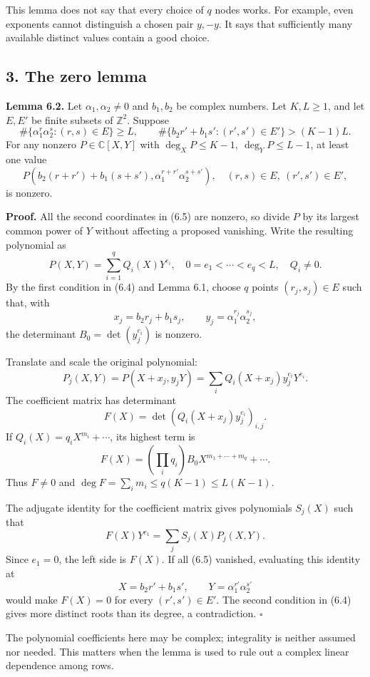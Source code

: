 \documentclass[
  11pt,
  a4paper,
]{article}
\begin{document}
This lemma does not say that every choice of \(q\) nodes works. For
example, even exponents cannot distinguish a chosen pair \(y,-y\). It
says that sufficiently many available distinct values contain a good
choice.

\subsection{3. The zero lemma}\label{the-zero-lemma}

\textbf{Lemma 6.2.} Let \(\alpha_1,\alpha_2\ne0\) and \(b_1,b_2\) be
complex numbers. Let \(K,L\ge1\), and let \(E,E'\) be finite subsets of
\(\mathbb Z^2\). Suppose \[
\#\{\alpha_1^r\alpha_2^s:(r,s)\in E\}\ge L,\qquad
\#\{b_2r'+b_1s':(r',s')\in E'\}>(K-1)L. \tag{6.4}
\] For any nonzero \(P\in\mathbb C[X,Y]\) with
\(\deg_XP\le K-1,\ \deg_YP\le L-1\), at least one value \[
P\!\left(b_2(r+r')+b_1(s+s'),
\alpha_1^{r+r'}\alpha_2^{s+s'}\right),
\quad (r,s)\in E,\ (r',s')\in E', \tag{6.5}
\] is nonzero.

\textbf{Proof.} All the second coordinates in (6.5) are nonzero, so
divide \(P\) by its largest common power of \(Y\) without affecting a
proposed vanishing. Write the resulting polynomial as \[
P(X,Y)=\sum_{i=1}^q Q_i(X)Y^{e_i},
\quad 0=e_1<\cdots<e_q<L,\quad Q_i\ne0.
\] By the first condition in (6.4) and Lemma 6.1, choose \(q\) points
\((r_j,s_j)\in E\) such that, with \[
x_j=b_2r_j+b_1s_j,\qquad y_j=\alpha_1^{r_j}\alpha_2^{s_j},
\] the determinant \(B_0=\det(y_j^{e_i})\) is nonzero.

Translate and scale the original polynomial: \[
P_j(X,Y)=P(X+x_j,y_jY)
=\sum_i Q_i(X+x_j)y_j^{e_i}Y^{e_i}.
\] The coefficient matrix has determinant \[
F(X)=\det(Q_i(X+x_j)y_j^{e_i})_{i,j}.
\] If \(Q_i(X)=q_iX^{m_i}+\cdots\), its highest term is \[
F(X)=\left(\prod_iq_i\right)B_0X^{m_1+\cdots+m_q}+\cdots.
\] Thus \(F\ne0\) and \(\deg F=\sum_i m_i\le q(K-1)\le L(K-1)\).

The adjugate identity for the coefficient matrix gives polynomials
\(S_j(X)\) such that \[
F(X)Y^{e_1}=\sum_j S_j(X)P_j(X,Y).
\] Since \(e_1=0\), the left side is \(F(X)\). If all (6.5) vanished,
evaluating this identity at \[
X=b_2r'+b_1s',\qquad Y=\alpha_1^{r'}\alpha_2^{s'}
\] would make \(F(X)=0\) for every \((r',s')\in E'\). The second
condition in (6.4) gives more distinct roots than its degree, a
contradiction. \(\square\)

The polynomial coefficients here may be complex; integrality is neither
assumed nor needed. This matters when the lemma is used to rule out a
complex linear dependence among rows.
\end{document}
